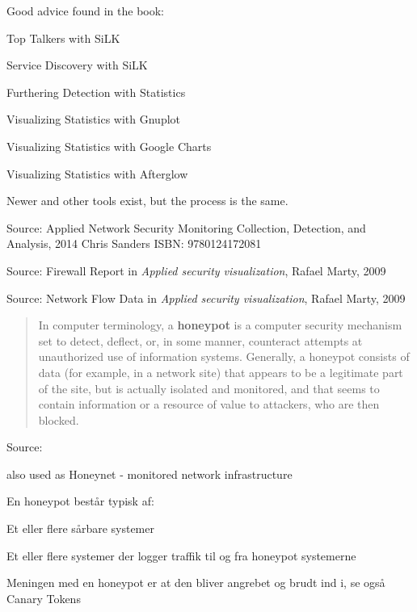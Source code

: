 \documentclass[Screen16to9,17pt]{foils}
\begin{document}
Good advice found in the book:
\begin{list2}
\item Top Talkers with SiLK
\item Service Discovery with SiLK
\item Furthering Detection with Statistics
\item Visualizing Statistics with Gnuplot
\item Visualizing Statistics with Google Charts
\item Visualizing Statistics with Afterglow
\end{list2}

Newer and other tools exist, but the process is the same.

Source: Applied Network Security Monitoring Collection, Detection, and Analysis, 2014 Chris Sanders ISBN: 9780124172081





Source: Firewall Report in \emph{Applied security visualization}, Rafael Marty, 2009




Source: Network Flow Data in \emph{Applied security visualization}, Rafael Marty, 2009




\vskip 1cm
\begin{quote}
In computer terminology, a {\bf honeypot} is a computer security mechanism set to detect, deflect, or, in some manner, counteract attempts at unauthorized use of information systems. Generally, a honeypot consists of data (for example, in a network site) that appears to be a legitimate part of the site, but is actually isolated and monitored, and that seems to contain information or a resource of value to attackers, who are then blocked.
\end{quote}

Source:

also used as Honeynet - monitored network infrastructure

\begin{list1}
\item En honeypot består typisk af:
  \begin{list2}
    \item Et eller flere sårbare systemer
\item Et eller flere systemer der logger traffik til og fra honeypot
  systemerne
  \end{list2}
\item Meningen med en honeypot er at den bliver angrebet og brudt ind
  i, se også Canary Tokens
\end{list1}
\end{document}

